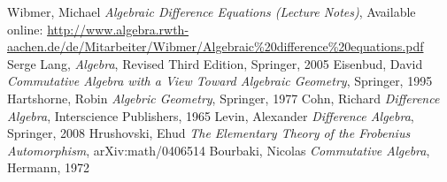 \documentclass{article}
\def\s{\sigma}
\def\sSpec{\sigma\text{-Spec}}
\theoremstyle{plain}
\newtheorem{ex}[Satz]{Example}
\theoremstyle{definition}
\newtheorem{rem}[Satz]{Remark}
\begin{document}




\clearpage 
\begin{thebibliography}{9}
 Wibmer, Michael \emph{Algebraic Difference Equations (Lecture Notes)}, Available online: \url{http://www.algebra.rwth-aachen.de/de/Mitarbeiter/Wibmer/Algebraic\%20difference\%20equations.pdf}
 Serge Lang, \emph{Algebra}, Revised Third Edition, Springer, 2005
 Eisenbud, David \emph{Commutative Algebra with a View Toward Algebraic Geometry}, Springer, 1995
 Hartshorne, Robin \emph{Algebric Geometry}, Springer, 1977
 Cohn,  Richard \emph{Difference Algebra}, Interscience Publishers, 1965
 Levin, Alexander \emph{Difference Algebra}, Springer, 2008
 Hrushovski, Ehud \emph{The Elementary Theory of the Frobenius Automorphism}, arXiv:math/0406514 
 Bourbaki, Nicolas \emph{Commutative Algebra}, Hermann, 1972
\end{thebibliography}

\clearpage
\printindex
\end{document}
